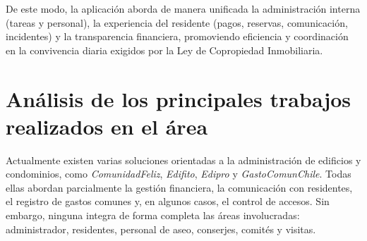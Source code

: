 De este modo, la aplicación aborda de manera unificada la administración interna (tareas y personal), la experiencia del residente (pagos, reservas, comunicación, incidentes) y la transparencia financiera, promoviendo eficiencia y coordinación en la convivencia diaria exigidos por la Ley de Copropiedad Inmobiliaria.

\section{Análisis de los principales trabajos realizados en el área}

Actualmente existen varias soluciones orientadas a la administración de edificios y condominios, como \textit{ComunidadFeliz}, \textit{Edifito}, \textit{Edipro} y \textit{GastoComunChile}. Todas ellas abordan parcialmente la gestión financiera, la comunicación con residentes, el registro de gastos comunes y, en algunos casos, el control de accesos. Sin embargo, ninguna integra de forma completa las áreas involucradas: administrador, residentes, personal de aseo, conserjes, comités y visitas.

